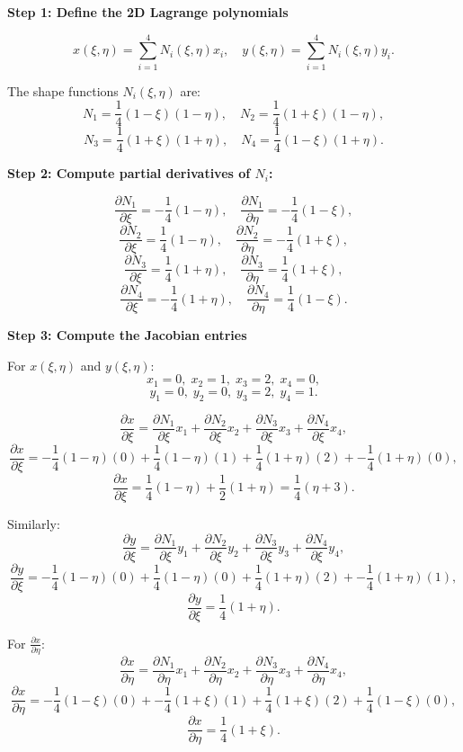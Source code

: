 \documentclass[11pt]{article}
\begin{document}
\textbf{Step 1: Define the 2D Lagrange polynomials}

\[
x(\xi, \eta) = \sum_{i=1}^4 N_i(\xi, \eta) x_i, \quad y(\xi, \eta) = \sum_{i=1}^4 N_i(\xi, \eta) y_i.
\]

The shape functions \(N_i(\xi, \eta)\) are:
\[
N_1 = \frac{1}{4}(1-\xi)(1-\eta), \quad N_2 = \frac{1}{4}(1+\xi)(1-\eta),
\]
\[
N_3 = \frac{1}{4}(1+\xi)(1+\eta), \quad N_4 = \frac{1}{4}(1-\xi)(1+\eta).
\]

\textbf{Step 2: Compute partial derivatives of \(N_i\):}

\[
\frac{\partial N_1}{\partial \xi} = -\frac{1}{4}(1-\eta), \quad \frac{\partial N_1}{\partial \eta} = -\frac{1}{4}(1-\xi),
\]
\[
\frac{\partial N_2}{\partial \xi} = \frac{1}{4}(1-\eta), \quad \frac{\partial N_2}{\partial \eta} = -\frac{1}{4}(1+\xi),
\]
\[
\frac{\partial N_3}{\partial \xi} = \frac{1}{4}(1+\eta), \quad \frac{\partial N_3}{\partial \eta} = \frac{1}{4}(1+\xi),
\]
\[
\frac{\partial N_4}{\partial \xi} = -\frac{1}{4}(1+\eta), \quad \frac{\partial N_4}{\partial \eta} = \frac{1}{4}(1-\xi).
\]

\textbf{Step 3: Compute the Jacobian entries}

For \(x(\xi, \eta)\) and \(y(\xi, \eta)\):
\[
x_1 = 0, \; x_2 = 1, \; x_3 = 2, \; x_4 = 0,
\]
\[
y_1 = 0, \; y_2 = 0, \; y_3 = 2, \; y_4 = 1.
\]

\[
\frac{\partial x}{\partial \xi} = \frac{\partial N_1}{\partial \xi} x_1 + \frac{\partial N_2}{\partial \xi} x_2 + \frac{\partial N_3}{\partial \xi} x_3 + \frac{\partial N_4}{\partial \xi} x_4,
\]
\[
\frac{\partial x}{\partial \xi} = -\frac{1}{4}(1-\eta)(0) + \frac{1}{4}(1-\eta)(1) + \frac{1}{4}(1+\eta)(2) + -\frac{1}{4}(1+\eta)(0),
\]
\[
\frac{\partial x}{\partial \xi} = \frac{1}{4}(1-\eta) + \frac{1}{2}(1+\eta) = \frac{1}{4}(\eta + 3).
\]

Similarly:
\[
\frac{\partial y}{\partial \xi} = \frac{\partial N_1}{\partial \xi} y_1 + \frac{\partial N_2}{\partial \xi} y_2 + \frac{\partial N_3}{\partial \xi} y_3 + \frac{\partial N_4}{\partial \xi} y_4,
\]
\[
\frac{\partial y}{\partial \xi} = -\frac{1}{4}(1-\eta)(0) + \frac{1}{4}(1-\eta)(0) + \frac{1}{4}(1+\eta)(2) + -\frac{1}{4}(1+\eta)(1),
\]
\[
\frac{\partial y}{\partial \xi} = \frac{1}{4}(1+\eta).
\]

For \(\frac{\partial x}{\partial \eta}\):
\[
\frac{\partial x}{\partial \eta} = \frac{\partial N_1}{\partial \eta} x_1 + \frac{\partial N_2}{\partial \eta} x_2 + \frac{\partial N_3}{\partial \eta} x_3 + \frac{\partial N_4}{\partial \eta} x_4,
\]
\[
\frac{\partial x}{\partial \eta} = -\frac{1}{4}(1-\xi)(0) + -\frac{1}{4}(1+\xi)(1) + \frac{1}{4}(1+\xi)(2) + \frac{1}{4}(1-\xi)(0),
\]
\[
\frac{\partial x}{\partial \eta} = \frac{1}{4}(1+\xi).
\]
\end{document}
